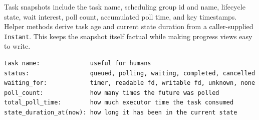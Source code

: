 Task snapshots include the task name, scheduling group id and name, lifecycle
state, wait interest, poll count, accumulated poll time, and key timestamps.
Helper methods derive task age and current state duration from a caller-supplied
\texttt{Instant}. This keeps the snapshot itself factual while making progress
views easy to write.

\begin{lstlisting}[language={},caption={Reading a task snapshot}]
task name:              useful for humans
status:                 queued, polling, waiting, completed, cancelled
waiting_for:            timer, readable fd, writable fd, unknown, none
poll_count:             how many times the future was polled
total_poll_time:        how much executor time the task consumed
state_duration_at(now): how long it has been in the current state
\end{lstlisting}
